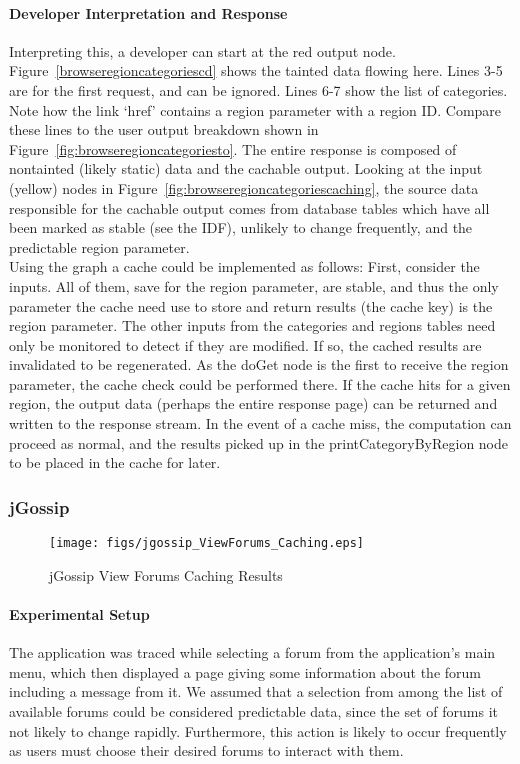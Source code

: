 \documentclass[msc,oneside]{ubcthesis}
\begin{document}
\paragraph{Developer Interpretation and Response}
Interpreting this, a developer can start at the red output node. Figure~\ref{browseregioncategoriescd} shows the tainted data flowing here. Lines 3-5 are for the first request, and can be ignored. Lines 6-7 show the list of categories. Note how the link `href' contains a region parameter with a region ID. Compare these lines to the user output breakdown shown in Figure~\ref{fig:browseregioncategoriesto}. The entire response is composed of nontainted (likely static) data and the cachable output. Looking at the input (yellow) nodes in Figure~\ref{fig:browseregioncategoriescaching}, the source data responsible for the cachable output comes from database tables which have all been marked as stable (see the IDF), unlikely to change frequently, and the predictable region parameter. \\

Using the graph a cache could be implemented as follows: First, consider the inputs. All of them, save for the region parameter, are stable, and thus the only parameter the cache need use to store and return results (the cache key) is the region parameter. The other inputs from the categories and regions tables need only be monitored to detect if they are modified. If so, the cached results are invalidated to be regenerated. As the doGet node is the first to receive the region parameter, the cache check could be performed there. If the cache hits for a given region, the output data (perhaps the entire response page) can be returned and written to the response stream. In the event of a cache miss, the computation can proceed as normal, and the results picked up in the printCategoryByRegion node to be placed in the cache for later.

\subsubsection{jGossip} 

\begin{sidewaysfigure}
\centering
\scalebox{0.44}
{\texttt{[image: figs/jgossip\_ViewForums\_Caching.eps]}}
\caption{jGossip View Forums Caching Results} 
\label{fig:viewforumscaching}
\end{sidewaysfigure}

\paragraph{Experimental Setup}
\label{jgossip:caching}
The application was traced while selecting a forum from the application's main menu, which then displayed a page giving some information about the forum including a message from it. We assumed that a selection from among the list of available forums could be considered predictable data, since the set of forums it not likely to change rapidly. Furthermore, this action is likely to occur frequently as users must choose their desired forums to interact with them.
\end{document}
